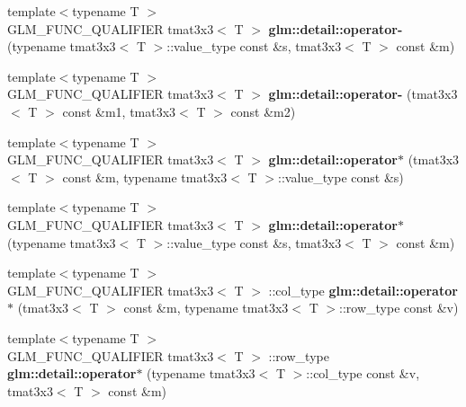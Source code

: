 \begin{DoxyCompactItemize}
\item 
\hypertarget{namespaceglm_1_1detail_a05200abbe69f3b78e9b9f16a45630d60}{{\footnotesize template$<$typename T $>$ }\\\-G\-L\-M\-\_\-\-F\-U\-N\-C\-\_\-\-Q\-U\-A\-L\-I\-F\-I\-E\-R tmat3x3$<$ \-T $>$ {\bfseries glm\-::detail\-::operator-\/} (typename tmat3x3$<$ \-T $>$\-::value\-\_\-type const \&s, tmat3x3$<$ \-T $>$ const \&m)}\label{namespaceglm_1_1detail_a05200abbe69f3b78e9b9f16a45630d60}

\item 
\hypertarget{namespaceglm_1_1detail_ab96738489ab488d649f649b052b6e74a}{{\footnotesize template$<$typename T $>$ }\\\-G\-L\-M\-\_\-\-F\-U\-N\-C\-\_\-\-Q\-U\-A\-L\-I\-F\-I\-E\-R tmat3x3$<$ \-T $>$ {\bfseries glm\-::detail\-::operator-\/} (tmat3x3$<$ \-T $>$ const \&m1, tmat3x3$<$ \-T $>$ const \&m2)}\label{namespaceglm_1_1detail_ab96738489ab488d649f649b052b6e74a}

\item 
\hypertarget{namespaceglm_1_1detail_ab075b7e9145c0c0892052b7e38451868}{{\footnotesize template$<$typename T $>$ }\\\-G\-L\-M\-\_\-\-F\-U\-N\-C\-\_\-\-Q\-U\-A\-L\-I\-F\-I\-E\-R tmat3x3$<$ \-T $>$ {\bfseries glm\-::detail\-::operator$\ast$} (tmat3x3$<$ \-T $>$ const \&m, typename tmat3x3$<$ \-T $>$\-::value\-\_\-type const \&s)}\label{namespaceglm_1_1detail_ab075b7e9145c0c0892052b7e38451868}

\item 
\hypertarget{namespaceglm_1_1detail_a602575d0150ac614e3018d945ef31522}{{\footnotesize template$<$typename T $>$ }\\\-G\-L\-M\-\_\-\-F\-U\-N\-C\-\_\-\-Q\-U\-A\-L\-I\-F\-I\-E\-R tmat3x3$<$ \-T $>$ {\bfseries glm\-::detail\-::operator$\ast$} (typename tmat3x3$<$ \-T $>$\-::value\-\_\-type const \&s, tmat3x3$<$ \-T $>$ const \&m)}\label{namespaceglm_1_1detail_a602575d0150ac614e3018d945ef31522}

\item 
\hypertarget{namespaceglm_1_1detail_a20e9e4ae1d4b6269af47d45c32165ead}{{\footnotesize template$<$typename T $>$ }\\\-G\-L\-M\-\_\-\-F\-U\-N\-C\-\_\-\-Q\-U\-A\-L\-I\-F\-I\-E\-R tmat3x3$<$ \-T $>$\*
\-::col\-\_\-type {\bfseries glm\-::detail\-::operator$\ast$} (tmat3x3$<$ \-T $>$ const \&m, typename tmat3x3$<$ \-T $>$\-::row\-\_\-type const \&v)}\label{namespaceglm_1_1detail_a20e9e4ae1d4b6269af47d45c32165ead}

\item 
\hypertarget{namespaceglm_1_1detail_a2b76346067dd63fab9e3cfa397259b3b}{{\footnotesize template$<$typename T $>$ }\\\-G\-L\-M\-\_\-\-F\-U\-N\-C\-\_\-\-Q\-U\-A\-L\-I\-F\-I\-E\-R tmat3x3$<$ \-T $>$\*
\-::row\-\_\-type {\bfseries glm\-::detail\-::operator$\ast$} (typename tmat3x3$<$ \-T $>$\-::col\-\_\-type const \&v, tmat3x3$<$ \-T $>$ const \&m)}\label{namespaceglm_1_1detail_a2b76346067dd63fab9e3cfa397259b3b}


\end{DoxyCompactItemize}
